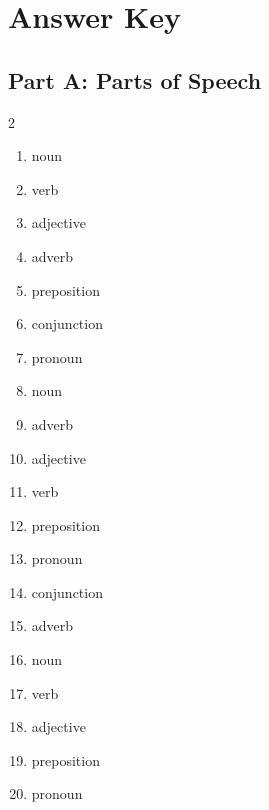 \documentclass[11pt]{article}
\begin{document}
\newpage
\section*{Answer Key}

\subsection*{Part A: Parts of Speech}
\begin{multicols}{2}
\begin{enumerate}
  \item noun
  \item verb
  \item adjective
  \item adverb
  \item preposition
  \item conjunction
  \item pronoun
  \item noun
  \item adverb
  \item adjective
  \item verb
  \item preposition
  \item pronoun
  \item conjunction
  \item adverb
  \item noun
  \item verb
  \item adjective
  \item preposition
  \item pronoun
\end{enumerate}
\end{multicols}
\end{document}
